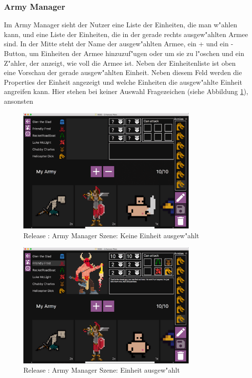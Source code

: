 \documentclass[12pt, titlepage]{scrartcl}
\newcommand{\RN}[1]{%
	\textup{\uppercase\expandafter{\romannumeral#1}}%
}
\begin{document}
		    \subsubsection{Army Manager}
		        Im Army Manager sieht der Nutzer eine Liste der Einheiten, die man w"ahlen kann, und eine Liste der Einheiten, die in der gerade rechts ausgew"ahlten Armee sind. In der Mitte steht der Name der ausgew"ahlten Armee, ein + und ein - Button, um Einheiten der Armee hinzuzuf"ugen oder um sie zu l"oschen und ein Z"ahler, der anzeigt, wie voll die Armee ist. Neben der Einheitenliste ist oben eine Vorschau der gerade ausgew"ahlten Einheit. Neben diesem Feld werden die Properties der Einheit angezeigt und welche Einheiten die ausgew"ahlte Einheit angreifen kann. Hier stehen bei keiner Auswahl Fragezeichen (siehe Abbildung \ref{Army_Manager_No_Unit_Selected}), ansonsten \\
		        \begin{figure}[H] 
    				\centering
    				\includegraphics[width=0.8\textwidth]{images/old_state/army_manager/NoUnitSelected.png}
    				\caption{Release \RN{2}: Army Manager Szene: Keine Einheit ausgew"ahlt}
    				\label{Army_Manager_No_Unit_Selected}
			    \end{figure}
			    \begin{figure}[H] 
    				\centering
    				\includegraphics[width=0.8\textwidth]{images/old_state/army_manager/UnitSelected.png}
    				\caption{Release \RN{2}: Army Manager Szene: Einheit ausgew"ahlt}
    				\label{Army_Manager_Unit_Selected}
			    \end{figure}
\end{document}
